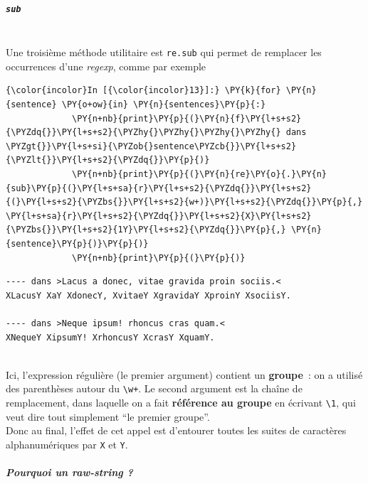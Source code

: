     \hypertarget{sub}{%
\subparagraph{\texorpdfstring{\texttt{sub}}{sub}\\\\}\label{sub}}

    Une troisième méthode utilitaire est \texttt{re.sub} qui permet de
remplacer les occurrences d'une \emph{regexp}, comme par exemple

    \begin{Verbatim}[commandchars=\\\{\}]
{\color{incolor}In [{\color{incolor}13}]:} \PY{k}{for} \PY{n}{sentence} \PY{o+ow}{in} \PY{n}{sentences}\PY{p}{:}
             \PY{n+nb}{print}\PY{p}{(}\PY{n}{f}\PY{l+s+s2}{\PYZdq{}}\PY{l+s+s2}{\PYZhy{}\PYZhy{}\PYZhy{}\PYZhy{} dans \PYZgt{}}\PY{l+s+si}{\PYZob{}sentence\PYZcb{}}\PY{l+s+s2}{\PYZlt{}}\PY{l+s+s2}{\PYZdq{}}\PY{p}{)}
             \PY{n+nb}{print}\PY{p}{(}\PY{n}{re}\PY{o}{.}\PY{n}{sub}\PY{p}{(}\PY{l+s+sa}{r}\PY{l+s+s2}{\PYZdq{}}\PY{l+s+s2}{(}\PY{l+s+s2}{\PYZbs{}}\PY{l+s+s2}{w+)}\PY{l+s+s2}{\PYZdq{}}\PY{p}{,} \PY{l+s+sa}{r}\PY{l+s+s2}{\PYZdq{}}\PY{l+s+s2}{X}\PY{l+s+s2}{\PYZbs{}}\PY{l+s+s2}{1Y}\PY{l+s+s2}{\PYZdq{}}\PY{p}{,} \PY{n}{sentence}\PY{p}{)}\PY{p}{)}
             \PY{n+nb}{print}\PY{p}{(}\PY{p}{)}
\end{Verbatim}


    \begin{Verbatim}[commandchars=\\\{\}]
---- dans >Lacus a donec, vitae gravida proin sociis.<
XLacusY XaY XdonecY, XvitaeY XgravidaY XproinY XsociisY.

---- dans >Neque ipsum! rhoncus cras quam.<
XNequeY XipsumY! XrhoncusY XcrasY XquamY.


    \end{Verbatim}

    Ici, l'expression régulière (le premier argument) contient un
\textbf{groupe}~: on a utilisé des parenthèses autour du
\texttt{\textbackslash{}w+}. Le second argument est la chaîne de
remplacement, dans laquelle on a fait \textbf{référence au groupe} en
écrivant \texttt{\textbackslash{}1}, qui veut dire tout simplement ``le
premier groupe''.\\

Donc au final, l'effet de cet appel est d'entourer toutes les suites de
caractères alphanumériques par \texttt{X} et \texttt{Y}.

    \hypertarget{pourquoi-un-raw-string}{%
\subparagraph{\texorpdfstring{Pourquoi un \emph{raw-string}
?}{Pourquoi un raw-string ?}\\\\}\label{pourquoi-un-raw-string}}

